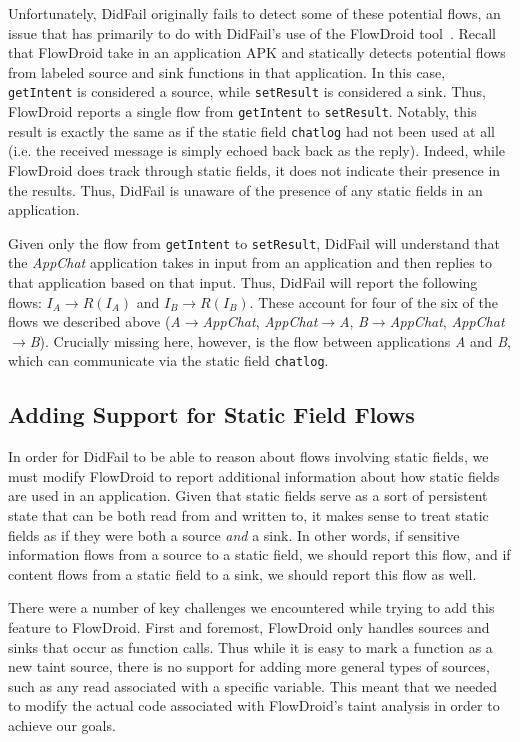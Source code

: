 Unfortunately, DidFail originally fails to detect some of these potential flows, an issue that has primarily to do with DidFail's use of the FlowDroid tool~\cite{flowdroid}. Recall that FlowDroid take in an application APK and statically detects potential flows from labeled source and sink functions in that application. In this case, \texttt{getIntent} is considered a source, while \texttt{setResult} is considered a sink. Thus, FlowDroid reports a single flow from \texttt{getIntent} to \texttt{setResult}. Notably, this result is exactly the same as if the static field \texttt{chatlog} had not been used at all (i.e. the received message is simply echoed back back as the reply). Indeed, while FlowDroid does track through static fields, it does not indicate their presence in the results. Thus, DidFail is unaware of the presence of any static fields in an application.

Given only the flow from \texttt{getIntent} to \texttt{setResult}, DidFail will understand that the \emph{AppChat} application takes in input from an application and then replies to that application based on that input. Thus, DidFail will report the following flows: $I_A\rightarrow R(I_A)$ and $I_B\rightarrow R(I_B)$. These account for four of the six of the flows we described above (\emph{A$\rightarrow$AppChat}, \emph{AppChat$\rightarrow$A}, \emph{B$\rightarrow$AppChat}, \emph{AppChat$\rightarrow$B}). Crucially missing here, however, is the flow between applications \emph{A} and \emph{B}, which can communicate via the static field \texttt{chatlog}. 

\subsection{Adding Support for Static Field Flows}

In order for DidFail to be able to reason about flows involving static fields, we must modify FlowDroid to report additional information about how static fields are used in an application. Given that static fields serve as a sort of persistent state that can be both read from and written to, it makes sense to treat static fields as if they were both a source \emph{and} a sink. In other words, if sensitive information flows from a source to a static field, we should report this flow, and if content flows from a static field to a sink, we should report this flow as well.

There were a number of key challenges we encountered while trying to add this feature to FlowDroid. First and foremost, FlowDroid only handles sources and sinks that occur as function calls. Thus while it is easy to mark a function as a new taint source, there is no support for adding more general types of sources, such as any read associated with a specific variable. This meant that we needed to modify the actual code associated with FlowDroid's taint analysis in order to achieve our goals.


